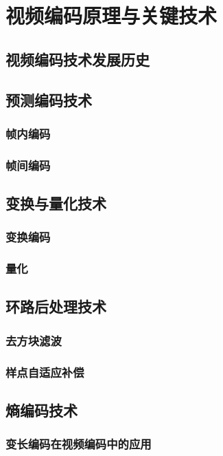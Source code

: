 \chapter{视频编码原理与关键技术}
\label{cha:c2}

\section{视频编码技术发展历史}

\section{预测编码技术}
\subsection{帧内编码}
\subsection{帧间编码}

\section{变换与量化技术}
\subsection{变换编码}
\subsection{量化}

\section{环路后处理技术}
\subsection{去方块滤波}
\subsection{样点自适应补偿}

\section{熵编码技术}
\subsection{变长编码在视频编码中的应用}
